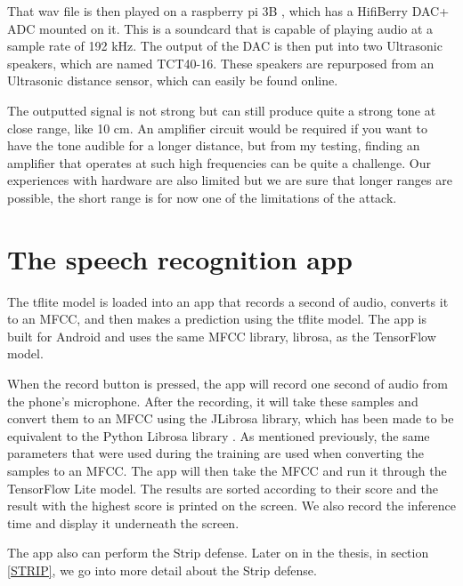 \documentclass{report}
\theoremstyle{definition}
\theoremstyle{remark}
\begin{document}
That wav file is then played on a raspberry pi 3B \cite{RASPBERRY}, which has a HifiBerry DAC+ ADC \cite{HIFIBERRY} mounted on it. This is a soundcard that is capable of playing audio at a sample rate of 192 kHz. The output of the DAC is then put into two Ultrasonic speakers, which are named TCT40-16. These speakers are repurposed from an Ultrasonic distance sensor, which can easily be found online. 


The outputted signal is not strong but can still produce quite a strong tone at close range, like 10 cm. An amplifier circuit would be required if you want to have the tone audible for a longer distance, but from  my testing, finding an amplifier that operates at such high frequencies can be quite a challenge. Our experiences with hardware are also limited but we are sure that longer ranges are possible, the short range is for now one of the limitations of the attack.

\section{The speech recognition app}
The tflite model is loaded into an app that records a second of audio, converts it to an MFCC, and then makes a prediction using the tflite model. The app is built for Android and uses the same MFCC library, librosa, as the TensorFlow model. 

When the record button is pressed, the app will record one second of audio from the phone's microphone. After the recording, it will take these samples and convert them to an MFCC using the JLibrosa library\cite{Jlibrosa}, which has been made to be equivalent to the Python Librosa library \cite{Librosa}. As mentioned previously, the same parameters that were used during the training are used when converting the samples to an MFCC. The app will then take the MFCC and run it through the TensorFlow Lite model. The results are sorted according to their score and the result with the highest score is printed on the screen. We also record the inference time and display it underneath the screen. 

The app also can perform the Strip defense. Later on in the thesis, in section \ref{STRIP}, we go into more detail about the Strip defense. 
\end{document}
